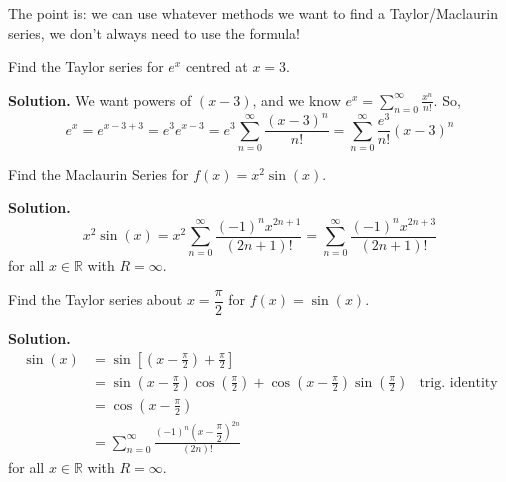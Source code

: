 The point is: we can use whatever methods we want to find a Taylor/Maclaurin
series, we don't always need to use the formula!

\begin{Example}{}{}
    Find the Taylor series for $ e^x $ centred at $ x=3 $.

    \textbf{Solution.} We want powers of $ (x-3) $,
    and we know $ \displaystyle e^x=\sum\limits_{n=0}^{\infty} \frac{x^n}{n!} $. So,
    \[ e^x=e^{x-3+3}=e^3 e^{x-3}
        =e^3 \sum\limits_{n=0}^{\infty} \frac{(x-3)^n}{n!}
        =\sum\limits_{n=0}^{\infty} \frac{e^3}{n!}(x-3)^n \]
\end{Example}

\begin{Example}{}{}
    Find the Maclaurin Series for $ f(x)=x^2\sin(x) $.

    \textbf{Solution.}
    \[ x^2\sin(x)=x^2
        \sum\limits_{n=0}^{\infty} \frac{(-1)^n x^{2n+1}}{(2n+1)!}
        =\sum\limits_{n=0}^{\infty} \frac{(-1)^n x^{2n+3}}{(2n+1)!} \]
    for all $ x\in\mathbb{R} $ with $ R=\infty $.
\end{Example}

\begin{Example}{}{}
    Find the Taylor series about $ x=\dfrac{\pi}{2} $ for $ f(x)=\sin(x) $.

    \textbf{Solution.}
    \begin{align*}
        \sin(x) & = \sin\left[ \left(x-\frac{\pi}{2}\right)+\frac{\pi}{2} \right]                                                                                                   \\
                & =\sin\left( x-\frac{\pi}{2}  \right)\cos\left( \frac{\pi}{2} \right) +\cos\left( x-\frac{\pi}{2} \right)\sin\left( \frac{\pi}{2} \right) & \text{trig.\ identity} \\
                & =\cos\left( x-\frac{\pi}{2} \right)                                                                                                                               \\
                & =\sum\limits_{n=0}^{\infty} \frac{(-1)^n \left( x-\dfrac{\pi}{2} \right)^{2n}}{(2n)!}
    \end{align*}
    for all $ x\in\mathbb{R} $ with $ R=\infty $.
\end{Example}

